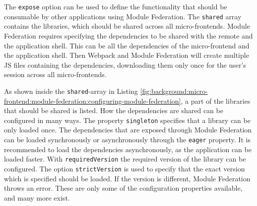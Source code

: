 \bigskip

\noindent The \texttt{expose} option can be used to define the functionality that should be consumable by other applications using Module Federation. The \texttt{shared} array contains the libraries, which should be shared across all micro-frontends. Module Federation requires specifying the dependencies to be shared with the remote and the application shell. This can be all the dependencies of the micro-frontend and the application shell. Then Webpack and Module Federation will create multiple \ac{JS} files containing the dependencies, downloading them only once for the user's session across all micro-frontends. \cite[125]{book:2021:mezzalira:applied-methods:building-micro-frontends}

\bigskip

\noindent As shown inside the \texttt{shared}-array in Listing \ref{fig:background:micro-frontend:module-federation:configuring-module-federation}, a part of the libraries that should be shared is listed. How the dependencies are shared can be configured in many ways. The property \texttt{singleton} specifies that a library can be only loaded once. The dependencies that are exposed through Module Federation can be loaded synchronously or asynchronously through the \texttt{eager} property. It is recommended to load the dependencies asynchronously, as the application can be loaded faster. With \texttt{requiredVersion} the required version of the library can be configured. The option \texttt{strictVersion} is used to specify that the exact version which is specified should be loaded. If the version is different, Module Federation throws an error. These are only some of the configuration properties available, and many more exist. \cite[125]{book:2021:mezzalira:applied-methods:building-micro-frontends}
